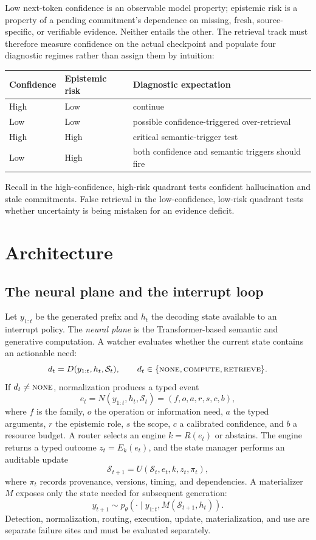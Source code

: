 \documentclass[11pt]{article}
\newcommand{\cstate}{\mathcal{S}}
\begin{document}
Low next-token confidence is an observable model property; epistemic risk is a
property of a pending commitment's dependence on missing, fresh,
source-specific, or verifiable evidence.  Neither entails the other.  The
retrieval track must therefore measure confidence on the actual checkpoint and
populate four diagnostic regimes rather than assign them by intuition:
\begin{center}
\begin{tabular}{lll}
\toprule
Confidence & Epistemic risk & Diagnostic expectation \\
\midrule
High & Low & continue \\
Low & Low & possible confidence-triggered over-retrieval \\
High & High & critical semantic-trigger test \\
Low & High & both confidence and semantic triggers should fire \\
\bottomrule
\end{tabular}
\end{center}
Recall in the high-confidence, high-risk quadrant tests confident hallucination
and stale commitments. False retrieval in the low-confidence, low-risk quadrant
tests whether uncertainty is being mistaken for an evidence deficit.

\section{Architecture}

\subsection{The neural plane and the interrupt loop}

Let $y_{1:t}$ be the generated prefix and $h_t$ the decoding state available to
an interrupt policy.  The \emph{neural plane} is the Transformer-based semantic
and generative computation.  A watcher evaluates whether the current state
contains an actionable need:
\[
  d_t = D(y_{1:t}, h_t, \cstate_t), \qquad
  d_t \in \{\textsc{none},\textsc{compute},\textsc{retrieve}\}.
\]
If $d_t\neq\textsc{none}$, normalization produces a typed event
\[
  e_t = N(y_{1:t},h_t,\cstate_t)
      = (f,o,a,r,s,c,b),
\]
where $f$ is the family, $o$ the operation or information need, $a$ the typed
arguments, $r$ the epistemic role, $s$ the scope, $c$ a calibrated confidence,
and $b$ a resource budget.  A router selects an engine $k=R(e_t)$ or abstains.
The engine returns a typed outcome $z_t=E_k(e_t)$, and the state manager performs
an auditable update
\[
  \cstate_{t+1}=U(\cstate_t,e_t,k,z_t,\pi_t),
\]
where $\pi_t$ records provenance, versions, timing, and dependencies.  A
materializer $M$ exposes only the state needed for subsequent generation:
\[
  y_{t+1}\sim p_\theta\!\left(\cdot\mid y_{1:t},
  M(\cstate_{t+1},h_t)\right).
\]
Detection, normalization, routing, execution, update, materialization, and use
are separate failure sites and must be evaluated separately.
\end{document}
